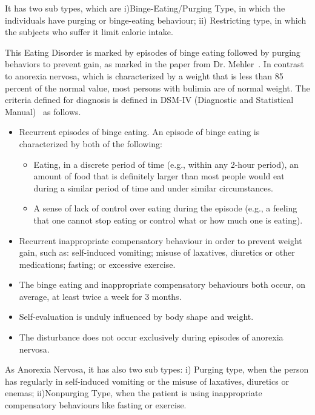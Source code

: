 It has two sub types, which are i)Binge-Eating/Purging Type, in which the individuals have purging or binge-eating behaviour; ii) Restricting type, in which the subjects who suffer it limit calorie intake.


This Eating Disorder is marked by episodes of binge eating followed by purging behaviors to prevent gain, as marked in the paper from Dr. Mehler~\cite{mehler2003bulimia}. In contrast to anorexia nervosa, which is characterized by a weight that is less than 85 percent of the normal value, most persons with bulimia are of normal weight. The criteria defined for diagnosis is defined in DSM-IV (Diagnostic and Statistical Manual)~\cite{widiger1997dsm} as follows.
\begin{itemize}
    \item Recurrent episodes of binge eating. An episode of binge eating is characterized by both of the following:
    \begin{itemize}
        \item Eating, in a discrete period of time (e.g., within any 2-hour period), an amount of food that is definitely larger than most people would eat during a similar period of time and under similar circumstances.
        \item A sense of lack of control over eating during the episode (e.g., a feeling that one cannot stop eating or control what or how much one is eating).
    \end{itemize}
    \item Recurrent inappropriate compensatory behaviour in order to prevent weight gain, such as: self-induced vomiting; misuse of laxatives, diuretics or other medications; fasting; or excessive exercise.
    \item The binge eating and inappropriate compensatory behaviours both occur, on average, at least twice a week for 3 months.
    \item Self-evaluation is unduly influenced by body shape and weight.
    \item The disturbance does not occur exclusively during episodes of anorexia nervosa.
\end{itemize}

As Anorexia Nervosa, it has also two sub types: i) Purging type, when the person has regularly in self-induced vomiting or the misuse of
laxatives, diuretics or enemas; ii)Nonpurging Type, when the patient is using inappropriate compensatory behaviours like fasting or exercise.

